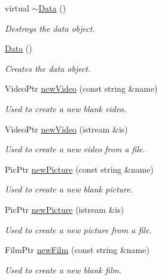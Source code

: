 \begin{DoxyCompactItemize}
\item 
virtual \hyperlink{classData_aab31956423290f0d62dcca47ab4d16dd}{$\sim$\+Data} ()
\begin{DoxyCompactList}\small\item\em Destroys the data object. \end{DoxyCompactList}\item 
\hypertarget{classData_af11f741cb7f587e2e495452a8905a22a}{}\hyperlink{classData_af11f741cb7f587e2e495452a8905a22a}{Data} ()\label{classData_af11f741cb7f587e2e495452a8905a22a}

\begin{DoxyCompactList}\small\item\em Creates the data object. \end{DoxyCompactList}\item 
Video\+Ptr \hyperlink{classData_a9a86e93e191dc4244c18928b908861cc}{new\+Video} (const string \&name)
\begin{DoxyCompactList}\small\item\em Used to create a new blank video. \end{DoxyCompactList}\item 
Video\+Ptr \hyperlink{classData_a9e7919b3ca3390c0002cd2ba2854bbc4}{new\+Video} (istream \&is)
\begin{DoxyCompactList}\small\item\em Used to create a new video from a file. \end{DoxyCompactList}\item 
Pic\+Ptr \hyperlink{classData_a1fb51b0d2aee38a233b505c8e4fb862d}{new\+Picture} (const string \&name)
\begin{DoxyCompactList}\small\item\em Used to create a new blank picture. \end{DoxyCompactList}\item 
Pic\+Ptr \hyperlink{classData_ac0d33face47c9aa31c5ced3bba1ba348}{new\+Picture} (istream \&is)
\begin{DoxyCompactList}\small\item\em Used to create a new picture from a file. \end{DoxyCompactList}\item 
Film\+Ptr \hyperlink{classData_abf84f4ca94b966ffe9f0a5272e4048d7}{new\+Film} (const string \&name)
\begin{DoxyCompactList}\small\item\em Used to create a new blank film. \end{DoxyCompactList}\item 

\end{DoxyCompactItemize}
